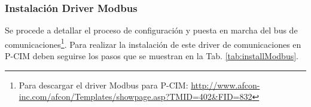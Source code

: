 \subsubsection{Instalación Driver Modbus}
Se procede a detallar el proceso de configuración y puesta en marcha
del bus de comunicaciones\footnote{Para descargar el driver Modbus para P-CIM:
\url{http://www.afcon-inc.com/afcon/Templates/showpage.asp?TMID=402&FID=832}}.
Para realizar la instalación de este driver de comunicaciones en P-CIM deben
seguirse los pasos que se muestran en la Tab. \ref{tab:installModbus}.
